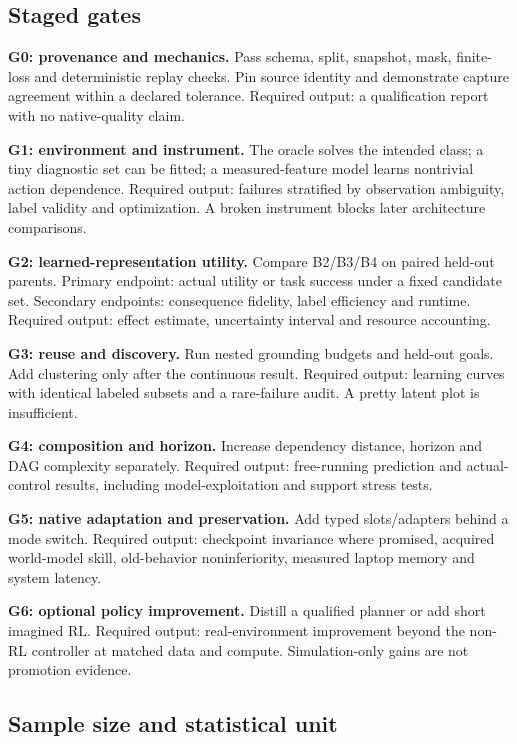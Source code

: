 \documentclass[
  11pt,
  a4paper,
]{article}
\begin{document}
\subsection{Staged gates}\label{staged-gates}

\textbf{G0: provenance and mechanics.} Pass schema, split, snapshot,
mask, finite-loss and deterministic replay checks. Pin source identity
and demonstrate capture agreement within a declared tolerance. Required
output: a qualification report with no native-quality claim.

\textbf{G1: environment and instrument.} The oracle solves the intended
class; a tiny diagnostic set can be fitted; a measured-feature model
learns nontrivial action dependence. Required output: failures
stratified by observation ambiguity, label validity and optimization. A
broken instrument blocks later architecture comparisons.

\textbf{G2: learned-representation utility.} Compare B2/B3/B4 on paired
held-out parents. Primary endpoint: actual utility or task success under
a fixed candidate set. Secondary endpoints: consequence fidelity, label
efficiency and runtime. Required output: effect estimate, uncertainty
interval and resource accounting.

\textbf{G3: reuse and discovery.} Run nested grounding budgets and
held-out goals. Add clustering only after the continuous result.
Required output: learning curves with identical labeled subsets and a
rare-failure audit. A pretty latent plot is insufficient.

\textbf{G4: composition and horizon.} Increase dependency distance,
horizon and DAG complexity separately. Required output: free-running
prediction and actual-control results, including model-exploitation and
support stress tests.

\textbf{G5: native adaptation and preservation.} Add typed
slots/adapters behind a mode switch. Required output: checkpoint
invariance where promised, acquired world-model skill, old-behavior
noninferiority, measured laptop memory and system latency.

\textbf{G6: optional policy improvement.} Distill a qualified planner or
add short imagined RL. Required output: real-environment improvement
beyond the non-RL controller at matched data and compute.
Simulation-only gains are not promotion evidence.

\subsection{Sample size and statistical
unit}\label{sample-size-and-statistical-unit}
\end{document}
